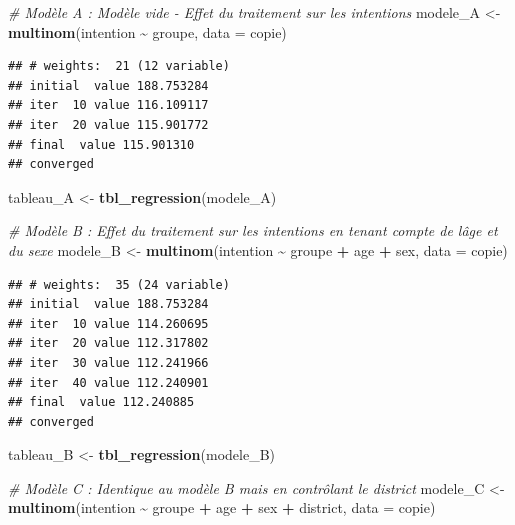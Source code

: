 \documentclass[
]{article}
\newenvironment{Shaded}{\begin{snugshade}}{\end{snugshade}}
\newcommand{\AttributeTok}[1]{\textcolor[rgb]{0.13,0.29,0.53}{#1}}
\newcommand{\CommentTok}[1]{\textcolor[rgb]{0.56,0.35,0.01}{\textit{#1}}}
\newcommand{\FunctionTok}[1]{\textcolor[rgb]{0.13,0.29,0.53}{\textbf{#1}}}
\newcommand{\NormalTok}[1]{#1}
\newcommand{\OtherTok}[1]{\textcolor[rgb]{0.56,0.35,0.01}{#1}}
\newcommand{\SpecialCharTok}[1]{\textcolor[rgb]{0.81,0.36,0.00}{\textbf{#1}}}
\begin{document}
\begin{Shaded}
\begin{Highlighting}[]
\CommentTok{\# Modèle A : Modèle vide {-} Effet du traitement sur les intentions}
\NormalTok{modele\_A }\OtherTok{\textless{}{-}} \FunctionTok{multinom}\NormalTok{(intention }\SpecialCharTok{\textasciitilde{}}\NormalTok{ groupe, }\AttributeTok{data =}\NormalTok{ copie)}
\end{Highlighting}
\end{Shaded}

\begin{verbatim}
## # weights:  21 (12 variable)
## initial  value 188.753284 
## iter  10 value 116.109117
## iter  20 value 115.901772
## final  value 115.901310 
## converged
\end{verbatim}

\begin{Shaded}
\begin{Highlighting}[]
\NormalTok{tableau\_A }\OtherTok{\textless{}{-}} \FunctionTok{tbl\_regression}\NormalTok{(modele\_A)}

\CommentTok{\# Modèle B : Effet du traitement sur les intentions en tenant compte de l\textquotesingle{}âge et du sexe}
\NormalTok{modele\_B }\OtherTok{\textless{}{-}} \FunctionTok{multinom}\NormalTok{(intention }\SpecialCharTok{\textasciitilde{}}\NormalTok{ groupe }\SpecialCharTok{+}\NormalTok{ age }\SpecialCharTok{+}\NormalTok{ sex, }\AttributeTok{data =}\NormalTok{ copie)}
\end{Highlighting}
\end{Shaded}

\begin{verbatim}
## # weights:  35 (24 variable)
## initial  value 188.753284 
## iter  10 value 114.260695
## iter  20 value 112.317802
## iter  30 value 112.241966
## iter  40 value 112.240901
## final  value 112.240885 
## converged
\end{verbatim}

\begin{Shaded}
\begin{Highlighting}[]
\NormalTok{tableau\_B }\OtherTok{\textless{}{-}} \FunctionTok{tbl\_regression}\NormalTok{(modele\_B)}

\CommentTok{\# Modèle C : Identique au modèle B mais en contrôlant le district}
\NormalTok{modele\_C }\OtherTok{\textless{}{-}} \FunctionTok{multinom}\NormalTok{(intention }\SpecialCharTok{\textasciitilde{}}\NormalTok{ groupe }\SpecialCharTok{+}\NormalTok{ age }\SpecialCharTok{+}\NormalTok{ sex }\SpecialCharTok{+}\NormalTok{ district, }\AttributeTok{data =}\NormalTok{ copie)}
\end{Highlighting}
\end{Shaded}
\end{document}
